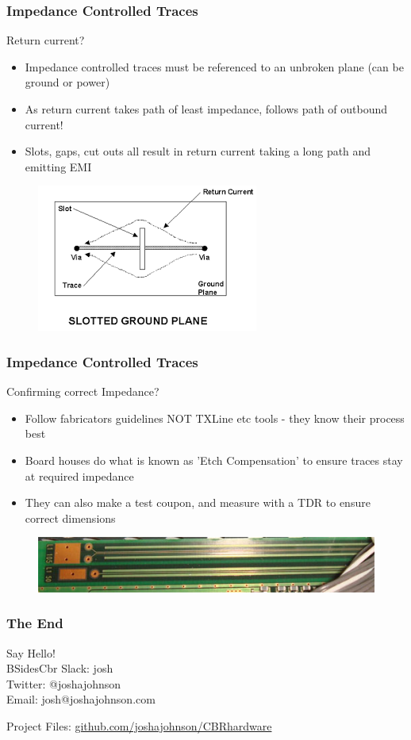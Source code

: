\documentclass[t]{beamer}
\begin{document}
\begin{frame}
\frametitle{Impedance Controlled Traces}
Return current?\\
\begin{itemize}
	\item Impedance controlled traces must be referenced to an unbroken plane (can be ground or power)
	\item As return current takes path of least impedance, follows path of outbound current!
	\item Slots, gaps, cut outs all result in return current taking a long path and emitting EMI
\end{itemize}
\begin{figure}
	\includegraphics[width=0.5\linewidth]{slot.png}
\end{figure}
\end{frame}
\begin{frame}
\frametitle{Impedance Controlled Traces}
Confirming correct Impedance?\\
\begin{itemize}
	\item Follow fabricators guidelines NOT TXLine etc tools - they know their process best
	\item Board houses do what is known as 'Etch Compensation' to ensure traces stay at required impedance
	\item They can also make a test coupon, and measure with a TDR to ensure correct dimensions
\end{itemize}
\begin{figure}
	\includegraphics[width=\linewidth]{testCoupon.jpg}
\end{figure}
\end{frame}
\begin{frame}
\frametitle{The End}

Say Hello! \\
BSidesCbr Slack: josh\\
Twitter: @\textunderscore joshajohnson\\
Email: josh@joshajohnson.com\\
\vspace{4mm}

Project Files: \url{github.com/joshajohnson/CBRhardware}\\
\end{frame}
\end{document}
